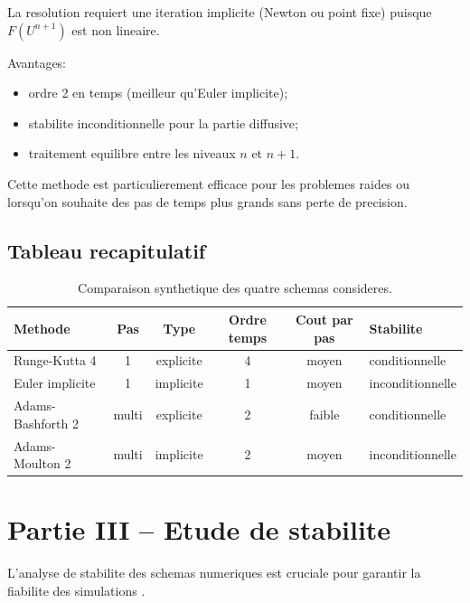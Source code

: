 \documentclass[11pt,a4paper]{report}
\begin{document}
La resolution requiert une iteration implicite (Newton ou point fixe) puisque $F(U^{n+1})$
est non lineaire.

Avantages:
\begin{itemize}[leftmargin=1.5em]
  \item ordre 2 en temps (meilleur qu'Euler implicite);
  \item stabilite inconditionnelle pour la partie diffusive;
  \item traitement equilibre entre les niveaux $n$ et $n+1$.
\end{itemize}

Cette methode est particulierement efficace pour les problemes raides ou lorsqu'on souhaite
des pas de temps plus grands sans perte de precision.

\section{Tableau recapitulatif}
\begin{table}[H]
\centering
\begin{tabular}{@{}lccccl@{}}
\toprule
Methode & Pas & Type & Ordre temps & Cout par pas & Stabilite \\
\midrule
Runge-Kutta 4 & 1 & explicite & 4 & moyen & conditionnelle \\
Euler implicite & 1 & implicite & 1 & moyen & inconditionnelle \\
Adams-Bashforth 2 & multi & explicite & 2 & faible & conditionnelle \\
Adams-Moulton 2 & multi & implicite & 2 & moyen & inconditionnelle \\
\bottomrule
\end{tabular}
\caption{Comparaison synthetique des quatre schemas consideres.}
\end{table}

\chapter{Partie III -- Etude de stabilite}
L'analyse de stabilite des schemas numeriques est cruciale pour garantir la fiabilite
des simulations \cite{Hundsdorfer1995,Rannacher1984}.
\end{document}
